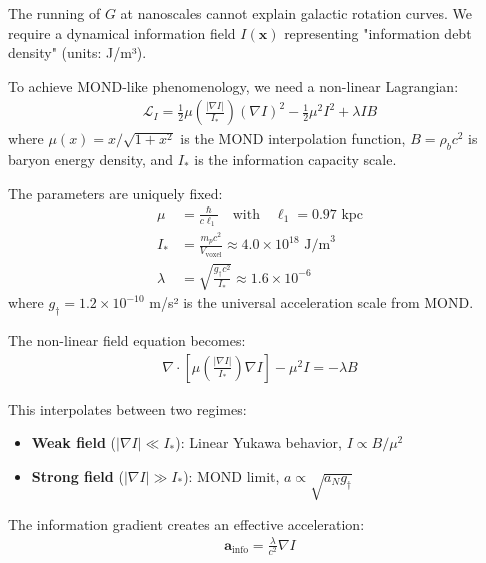 \documentclass[12pt]{article}
\begin{document}
The running of $G$ at nanoscales cannot explain galactic rotation curves. We require a dynamical information field $I(\mathbf{x})$ representing "information debt density" (units: J/m³).

\begin{definition}
To achieve MOND-like phenomenology, we need a non-linear Lagrangian:
\begin{align}
\mathcal{L}_I = \frac{1}{2}\mu\left(\frac{|\nabla I|}{I_*}\right)(\nabla I)^2 - \frac{1}{2}\mu^2 I^2 + \lambda I B
\end{align}
where $\mu(x) = x/\sqrt{1+x^2}$ is the MOND interpolation function, $B = \rho_b c^2$ is baryon energy density, and $I_*$ is the information capacity scale.
\end{definition}

\begin{theorem}
The parameters are uniquely fixed:
\begin{align}
\mu &= \frac{\hbar}{c \ell_1} \quad \text{with} \quad \ell_1 = 0.97 \text{ kpc} \\
I_* &= \frac{m_p c^2}{V_{\text{voxel}}} \approx 4.0 \times 10^{18} \text{ J/m}^3 \\
\lambda &= \sqrt{\frac{g_\dagger c^2}{I_*}} \approx 1.6 \times 10^{-6}
\end{align}
where $g_\dagger = 1.2 \times 10^{-10}$ m/s² is the universal acceleration scale from MOND.
\end{theorem}

The non-linear field equation becomes:
\begin{align}
\nabla \cdot \left[\mu\left(\frac{|\nabla I|}{I_*}\right)\nabla I\right] - \mu^2 I = -\lambda B
\end{align}

This interpolates between two regimes:
\begin{itemize}
\item \textbf{Weak field} ($|\nabla I| \ll I_*$): Linear Yukawa behavior, $I \propto B/\mu^2$
\item \textbf{Strong field} ($|\nabla I| \gg I_*$): MOND limit, $a \propto \sqrt{a_N g_\dagger}$
\end{itemize}

The information gradient creates an effective acceleration:
\begin{align}
\mathbf{a}_{\text{info}} = \frac{\lambda}{c^2}\nabla I
\end{align}
\end{document}
